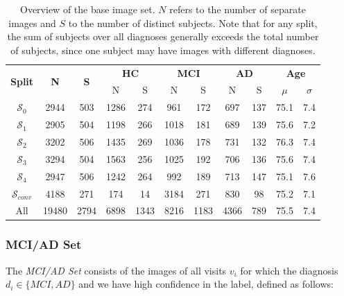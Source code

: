 \begin{table}[h]
	\begin{center}
		\begin{tabular}{c c c c c c c c c c c}
			\toprule
			\multirow{2}{*}{\bfseries Split} & 
			\multirow{2}{*}{\bfseries N} & 
			\multirow{2}{*}{\bfseries S} & 
			\multicolumn{2}{c}{\bfseries HC} & 
			\multicolumn{2}{c}{\bfseries MCI} & 
			\multicolumn{2}{c}{\bfseries AD} &
			\multicolumn{2}{c}{\bfseries Age} \\
			\cmidrule(lr){4-5}
			\cmidrule(lr){6-7}
			\cmidrule(lr){8-9}
			\cmidrule(lr){10-11} 
			& & & N & S & N & S & N & S & $\mu$ & $\sigma$ \\ 
			\cmidrule(lr){1-11}
			$\mathcal{S}_0$      &  2944 &  503 & 1286 &  274 &  961 &  172 &  697 & 137 & 75.1 & 7.4 \\
			$\mathcal{S}_1$      &  2905 &  504 & 1198 &  266 & 1018 &  181 &  689 & 139 & 75.6 & 7.2 \\
			$\mathcal{S}_2$      &  3202 &  506 & 1435 &  269 & 1036 &  178 &  731 & 132 & 76.3 & 7.4 \\
			$\mathcal{S}_3$      &  3294 &  504 & 1563 &  256 & 1025 &  192 &  706 & 136 & 75.6 & 7.4 \\
			$\mathcal{S}_4$      &  2947 &  506 & 1242 &  264 &  992 &  189 &  713 & 147 & 75.1 & 7.6 \\
			$\mathcal{S}_{conv}$ &  4188 &  271 &  174 &   14 & 3184 &  271 &  830 &  98 & 75.2 & 7.1 \\
			\cmidrule(lr){1-11}
			All             & 19480 & 2794 & 6898 & 1343 & 8216 & 1183 & 4366 & 789 & 75.5 & 7.4 \\
			\bottomrule
		\end{tabular}
		\caption{Overview of the base image set. $N$ refers to the number of separate images and $S$ to the number of distinct subjects. Note that for any split, the sum of subjects over all diagnoses generally exceeds the total number of subjects, since one subject may have images with different diagnoses.}
		\label{tab:baseset}
	\end{center}
\end{table}

\subsubsection*{MCI/AD Set} \label{sec:datmciad}
The \textit{MCI/AD Set} consists of the images of all visits $v_i$ for which the diagnosis $d_i \in \{MCI, AD\}$ and we have high confidence in the label, defined as follows:

